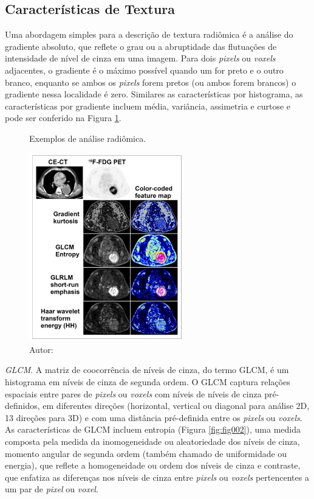 \subsection{Características de Textura}

Uma abordagem simples para a descrição de textura radiômica é a análise do gradiente absoluto, que reflete o grau ou a abruptidade das flutuações de intensidade de nível de cinza em uma imagem. Para dois \textit{pixels} ou \textit{voxels} adjacentes, o gradiente é o máximo possível quando um for preto e o outro branco, enquanto se ambos os \textit{pixels} forem pretos (ou ambos forem brancos) o gradiente nessa localidade é zero. Similares as características por histograma, as características por gradiente incluem média, variância, assimetria e curtose  e pode ser conferido na Figura \ref{fig:fig001}.

\captionsetup{justification=centering}
\begin{figure}[htbp]
    \centering
    \caption{Exemplos de análise radiômica.}
    \includegraphics[width=0.6\textwidth]{figures/fig001.png}
    \caption*{Autor: \cite{mayerhoeferIntroductionRadiomics2020}}
    \label{fig:fig001}
\end{figure}

 \textit{GLCM}. A matriz de coocorrência de níveis de cinza, do termo \gls{GLCM}, é um histograma em níveis de cinza de segunda ordem. O GLCM captura relações espaciais entre pares de \textit{pixels} ou \textit{voxels} com níveis de níveis de cinza pré-definidos, em diferentes direções (horizontal, vertical ou diagonal para análise 2D, 13 direções para 3D) e com uma distância pré-definida entre os \textit{pixels} ou \textit{voxels}. As características de GLCM incluem entropia (Figura \ref{fig:fig002}), uma medida composta pela medida da inomogeneidade ou aleatoriedade dos níveis de cinza, momento angular de segunda ordem (também chamado de uniformidade ou energia), que reflete a homogeneidade ou ordem dos níveis de cinza e contraste, que enfatiza as diferenças nos níveis de cinza entre \textit{pixels} ou \textit{voxels} pertencentes a um par de \textit{pixel} ou \textit{voxel}.

